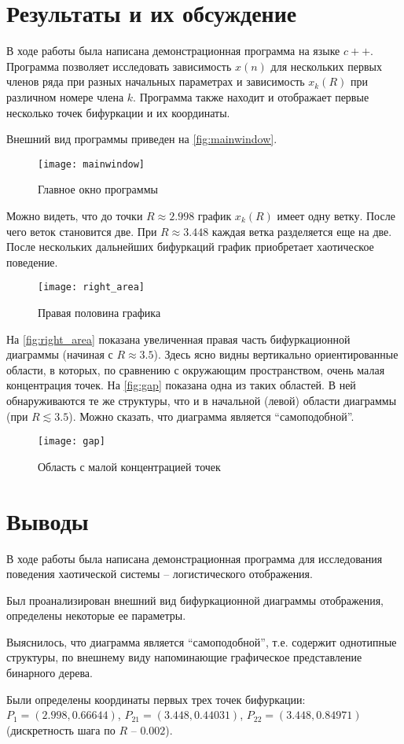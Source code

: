\section{Результаты и их обсуждение}

В ходе работы была написана демонстрационная программа на языке $c++$. Программа позволяет исследовать зависимость $x(n)$ для нескольких первых членов ряда при разных начальных параметрах и зависимость $x_k(R)$ при различном номере члена $k$. Программа также находит и отображает первые несколько точек бифуркации и их координаты.

Внешний вид программы приведен на \autoref{fig:mainwindow}.

\begin{figure}[h]%
\centering
\texttt{[image: mainwindow]}%
\caption[Главное окно программы.]{Главное окно программы}%
\label{fig:mainwindow}%
\end{figure}

Можно видеть, что до точки $R \approx 2.998$ график $x_k(R)$ имеет одну ветку. После чего веток становится две. При $R \approx 3.448$ каждая ветка разделяется еще на две. После нескольких дальнейших бифуркаций график приобретает хаотическое поведение.

\begin{figure}[h]%
\centering
\texttt{[image: right\_area]}%
\caption[Правая половина графика.]{Правая половина графика}%
\label{fig:right_area}%
\end{figure}

На \autoref{fig:right_area} показана увеличенная правая часть бифуркационной диаграммы (начиная с $R \approx 3.5$). Здесь ясно видны вертикально ориентированные области, в которых, по сравнению с окружающим пространством, очень малая концентрация точек. На \autoref{fig:gap} показана одна из таких областей. В ней обнаруживаются те же структуры, что и в начальной (левой) области диаграммы (при $R \lesssim 3.5$). Можно сказать, что диаграмма является \enquote{самоподобной}.

\begin{figure}[h]%
\centering
\texttt{[image: gap]}%
\caption[Область с малой концентрацией точек.]{Область с малой концентрацией точек}%
\label{fig:gap}%
\end{figure}

\section{Выводы}

В ходе работы была написана демонстрационная программа для исследования поведения хаотической системы -- логистического отображения.

Был проанализирован внешний вид бифуркационной диаграммы отображения, определены некоторые ее параметры.

Выяснилось, что диаграмма является \enquote{самоподобной}, т.е. содержит однотипные структуры, по внешнему виду напоминающие графическое представление бинарного дерева.

Были определены координаты первых трех точек бифуркации: $P_1 = \left(2.998, 0.66644\right)$, $P_{21} = \left(3.448, 0.44031\right)$, $P_{22} = \left(3.448, 0.84971\right)$ (дискретность шага по $R$ -- $0.002$).